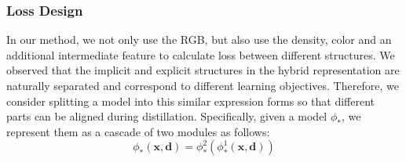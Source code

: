 \documentclass[letterpaper]{article} \usepackage{aaai23}  \usepackage{times}  \usepackage{helvet}  \usepackage{courier}  \usepackage[hyphens]{url}  \usepackage{graphicx} \urlstyle{rm} \def\UrlFont{\rm}  \usepackage{natbib}  \usepackage{caption} \frenchspacing  \setlength{\pdfpagewidth}{8.5in}  \setlength{\pdfpageheight}{11in}  \usepackage{multirow}
\begin{document}
\subsubsection{Loss Design}
 In our method, we not only use the RGB, but also use the density, color and an additional intermediate feature to calculate loss between different structures. We observed that the implicit and explicit structures in the hybrid representation are naturally separated and correspond to different learning objectives. Therefore, we consider splitting a model into this similar expression forms so that different parts can be aligned during distillation. Specifically, given a model $\phi_*$, we represent them as a cascade of two modules as follows:
 \begin{equation}
    \phi_*(\mathbf{x}, \mathbf{d}) = \phi_{*}^2(\phi_{*}^1(\mathbf{x}, \mathbf{d}))
 \end{equation}
 
\end{document}
